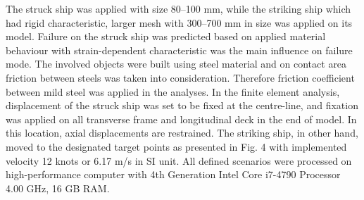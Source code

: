 \documentclass[../Final.tex]{subfiles}
\begin{document}
The struck ship was applied with size 80–100 mm, while the striking ship which had rigid characteristic, larger mesh with 300–700 mm in size was applied on its model. 
Failure on the struck ship was predicted based on applied material behaviour with strain-dependent characteristic was the main influence on failure mode. 
The involved objects were built using steel material and on contact area friction between steels was taken into consideration. Therefore friction coefficient between mild steel was applied in the analyses. 
In the finite element analysis, displacement of the struck ship was set to be fixed at the centre-line, and fixation was applied on all transverse frame and longitudinal deck in the end of model. 
In this location, axial displacements are restrained. The striking ship, in other hand, moved to the designated target points as presented in Fig. 4 with implemented velocity 12 knots or 6.17 m/s in SI unit. 
All defined scenarios were processed on high-performance computer with 4th Generation Intel Core i7-4790 Processor 4.00 GHz, 16 GB RAM. 
\end{document}
